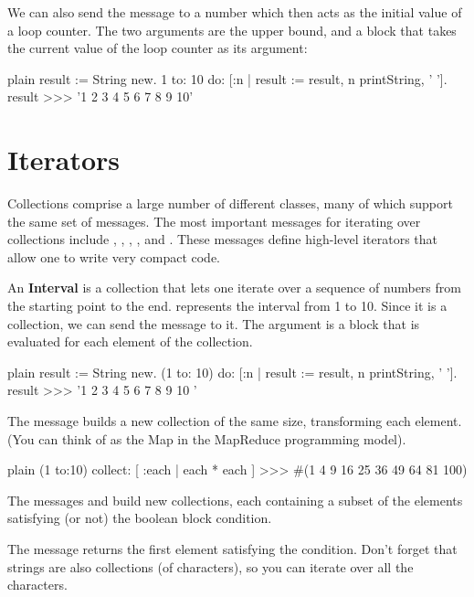 \documentclass[10pt,twoside,english]{_support/latex/sbabook/sbabook}
\begin{document}
We can also send the message  to a number which then acts as the
initial value of a loop counter. The two arguments are the upper bound, and a
block that takes the current value of the loop counter as its argument:

\begin{displaycode}{plain}
result := String new.
1 to: 10 do: [:n | result := result, n printString, ' '].
result 
>>> '1 2 3 4 5 6 7 8 9 10'
\end{displaycode}
\section{Iterators}
Collections comprise a large number of different classes, many of which support the same set of messages.
The most important messages for iterating over collections include , , ,
,  and . These messages define high-level
iterators that allow one to write very compact code.

An \textbf{Interval} is a collection that lets one iterate over a sequence of numbers
from the starting point to the end.  represents the interval from 1
to 10. Since it is a collection, we can send the message  to it. The argument
is a block that is evaluated for each element of the collection.

\begin{displaycode}{plain}
result := String new.
(1 to: 10) do: [:n | result := result, n printString, ' '].
result 
>>> '1 2 3 4 5 6 7 8 9 10 '
\end{displaycode}

The message  builds a new collection of the same size, transforming each
element. (You can think of  as the Map in the MapReduce
programming model).

\begin{displaycode}{plain}
(1 to:10) collect: [ :each | each * each ] 
>>> #(1 4 9 16 25 36 49 64 81 100)
\end{displaycode}

The messages  and  build new collections, each containing a subset of
the elements satisfying (or not) the boolean block condition.

The message  returns the first element satisfying the condition. Don't forget
that strings are also collections (of characters), so you can iterate over all
the characters.
\end{document}
